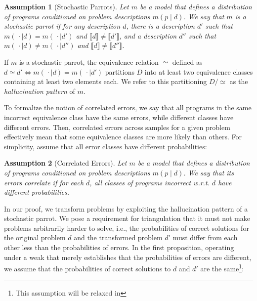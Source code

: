 \documentclass[acmsmall,screen,nonacm]{acmart}
\newtheorem{assumption}{Assumption}
\begin{document}
\begin{assumption}[Stochastic Parrots]\label{assume:parrot}
  Let $m$ be a model that defines a distribution of programs conditioned on problem descriptions $m(p \mid d)$. We say that $m$ is a stochastic parrot if for any description $d$, there is a description $d'$ such that $m(\,\cdot \mid d) = m(\,\cdot \mid d')$ and $\llbracket d \rrbracket \neq \llbracket d' \rrbracket$, and a description $d''$ such that $m(\,\cdot \mid d) \neq m(\,\cdot \mid d'')$ and $\llbracket d \rrbracket \neq \llbracket d'' \rrbracket$.
\end{assumption}

\noindent If $m$ is a stochastic parrot, the equivalence relation $\simeq$ defined as $d \simeq d' \Leftrightarrow m(\,\cdot\mid d) = m(\,\cdot\mid d')$ partitions $D$ into at least two equivalence classes containing at least two elements each. We refer to this partitioning $D/\simeq$ as the \emph{hallucination pattern} of $m$.

To formalize the notion of correlated errors, we say that all programs in the same incorrect equivalence class have the same errors, while different classes have different errors. Then, correlated errors across samples for a given problem effectively mean that some equivalence classes are more likely than others. For simplicity, assume that all error classes have different probabilities:

\begin{assumption}[Correlated Errors]\label{assume:correlated}
Let $m$ be a model that defines a distribution of programs conditioned on problem descriptions $m(p \mid d)$. We say that its errors correlate if for each $d$, all classes of programs incorrect w.r.t. $d$ have different probabilities.
\end{assumption}

In our proof, we transform problems by exploiting the hallucination pattern of a stochastic parrot. We pose a requirement for triangulation that it must not make problems arbitrarily harder to solve, i.e., the probabilities of correct solutions for the original problem $d$ and the transformed problem $d'$ must differ from each other less than the probabilities of errors. In the first proposition, operating under a weak  that merely establishes that the probabilities of errors are different, we assume that the probabilities of correct solutions to $d$ and $d'$ are the same\footnote{This assumption will be relaxed in }:
\end{document}
